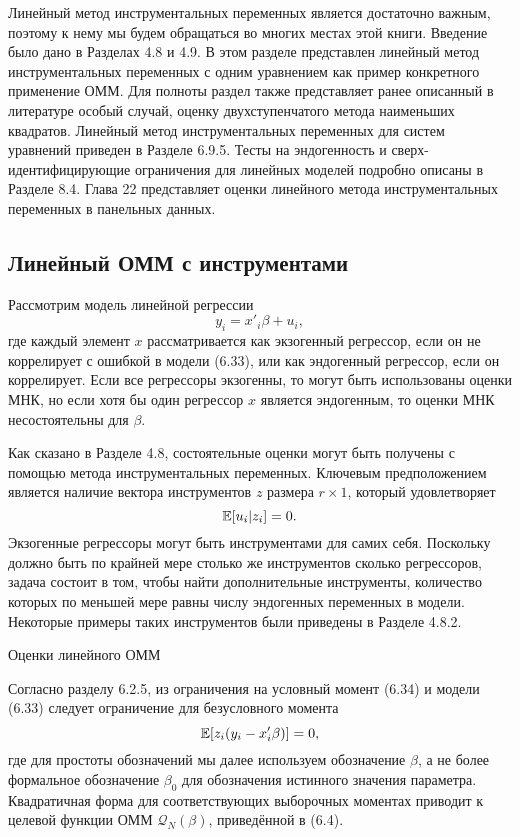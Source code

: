 Линейный метод инструментальных переменных является достаточно важным, поэтому к нему мы будем обращаться во многих местах этой книги. Введение было дано в Разделах 4.8 и 4.9. В этом разделе представлен линейный метод инструментальных переменных с одним уравнением как пример конкретного применение ОММ. Для полноты раздел также представляет ранее описанный в литературе особый случай, оценку двухступенчатого метода наименьших квадратов. Линейный метод инструментальных переменных для систем уравнений приведен в Разделе 6.9.5. Тесты на эндогенность и сверх-идентифицирующие ограничения для линейных моделей подробно описаны в Разделе 8.4. Глава 22 представляет оценки линейного метода инструментальных переменных в панельных данных.

\subsection{Линейный ОММ с инструментами}

Рассмотрим модель линейной регрессии
\begin{equation}
y_i = x'_i \beta+ u_i, 
\end{equation}
где каждый элемент $x$ рассматривается как экзогенный регрессор, если он не коррелирует с ошибкой в модели (6.33), или как эндогенный регрессор, если он коррелирует. Если все регрессоры экзогенны, то могут быть использованы оценки МНК, но если хотя бы один регрессор $x$ является эндогенным, то оценки МНК несостоятельны для $\beta$.

Как сказано в Разделе 4.8, состоятельные оценки могут быть получены с помощью метода инструментальных переменных. Ключевым предположением является наличие вектора инструментов $z$ размера $r \times 1$, который удовлетворяет
\begin{equation}
\mathbb{E}[u_i|z_i]=0.
\end{equation}
Экзогенные регрессоры могут быть инструментами для самих себя. Поскольку должно быть по крайней мере столько же инструментов сколько регрессоров, задача состоит в том, чтобы найти дополнительные инструменты, количество которых по меньшей мере равны числу эндогенных переменных в модели. Некоторые примеры таких инструментов были приведены в Разделе 4.8.2.

\begin{center}
Оценки линейного ОММ
\end{center}

Согласно разделу 6.2.5, из ограничения на условный момент (6.34) и модели (6.33) следует ограничение для безусловного момента
\begin{equation}
\mathbb{E}[z_i(y_i-x'_i\beta)]=0,
\end{equation}
где для простоты обозначений мы далее используем обозначение $\beta$, а не более формальное обозначение $\beta_0$ для обозначения истинного значения параметра. Квадратичная форма для соответствующих выборочных моментах приводит к целевой функции ОММ $\mathcal{Q}_{N}(\beta)$, приведённой в (6.4).

